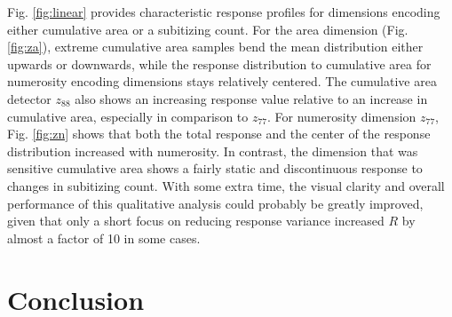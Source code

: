 \documentclass[twocolumn]{article}
\begin{document}
Fig. \ref{fig:linear}  provides characteristic response profiles for dimensions
encoding either cumulative area or a subitizing count. For the area
dimension (Fig. \ref{fig:za}), extreme cumulative area samples bend the mean distribution
either upwards or downwards, while the response distribution to
cumulative area for numerosity encoding dimensions stays relatively
centered. The cumulative area detector \(z_{88}\) also shows an increasing response value relative to an increase in cumulative area, especially in comparison to \(z_{77}\). For numerosity dimension \(z_{77}\), Fig. \ref{fig:zn} shows that both the total response and the center of the response distribution increased with
numerosity. In contrast, the dimension that was sensitive cumulative area shows a fairly
static and discontinuous response to changes in subitizing count. With some extra time,
the visual clarity and overall performance of this qualitative analysis
could probably be greatly improved, given that only a short focus on
reducing response variance increased \(R\) by almost a factor of 10 in
some cases.

\hypertarget{conclusion}{%
\section{Conclusion}\label{conclusion}}
\end{document}
